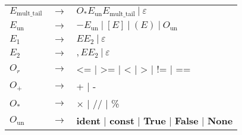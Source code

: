 \documentclass[a4paper, 12pt]{report}
\begin{document}
\begin{figure}[!h]
\begin{center}
{\begin{tabular}{lcl}
$E_\text{mult\_tail}$ & $\to$ & $O_* E_\text{un} E_\text{mult\_tail} \ | \ \varepsilon$\\
$E_\text{un}$ & $\to$ & $- E_\text{un} \ | \  [E] \ | \ (E) \ | \ O_\text{un}$\\
$E_1$ & $\to$ & $E E_2 \ | \ \varepsilon$\\
$E_2$ & $\to$ & $, E E_2 \ | \ \varepsilon$\\
$O_r$ & $\to$ & <= | >= | < | > | != | ==\\
$O_+$ & $\to$ & + | -\\
$O_*$ & $\to$ & $\times$ | // | \%\\
$O_\text{un}$ & $\to$ &  \textbf{ident} | \textbf{const} | \textbf{True} | \textbf{False} | \textbf{None}
\end{tabular}
}
\label{grammar_ll2}
\end{center}\end{figure}
\end{document}
